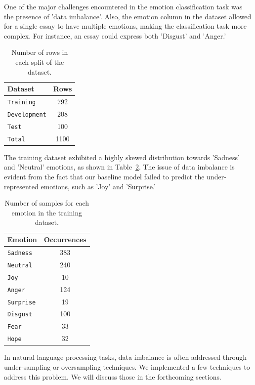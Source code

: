 \documentclass[11pt]{article}
\begin{document}
One of the major challenges encountered in the emotion classification task was the presence of 'data imbalance'. Also, the emotion column in the dataset allowed for a single essay to have multiple emotions, making the classification task more complex. For instance, an essay could express both 'Disgust' and 'Anger.'

\begin{table}
\centering
\begin{tabular}{lc}
\hline
\textbf{Dataset} & \textbf{Rows}\\
\hline
\verb|Training| & 792 \\
\verb|Development| & 208 \\
\verb|Test| & 100 \\
\hline
\hline
\verb|Total| & 1100
\end{tabular}
\caption{Number of rows in each split of the dataset.}
\label{tab:data_split}
\end{table}


The training dataset exhibited a highly skewed distribution towards 'Sadness' and 'Neutral' emotions, as shown in Table~\ref{tab:emotion_split}. The issue of data imbalance is evident from the fact that our baseline model failed to predict the under-represented emotions, such as 'Joy' and 'Surprise.'

\begin{table}
\centering
\begin{tabular}{lc}
\hline
\textbf{Emotion} & \textbf{Occurrences}\\
\hline
\verb|Sadness| & 383 \\
\verb|Neutral| & 240 \\
\verb|Joy| & 10 \\ 
\verb|Anger| & 124 \\
\verb|Surprise| & 19 \\
\verb|Disgust| & 100 \\ 
\verb|Fear| & 33 \\
\verb|Hope| & 32 \\
\hline
\end{tabular}
\caption{Number of samples for each emotion in the training dataset.}
\label{tab:emotion_split}
\end{table}

In natural language processing tasks, data imbalance is often addressed through under-sampling or oversampling techniques. We implemented a few techniques to address this problem. We will discuss those in the forthcoming sections.
\end{document}

